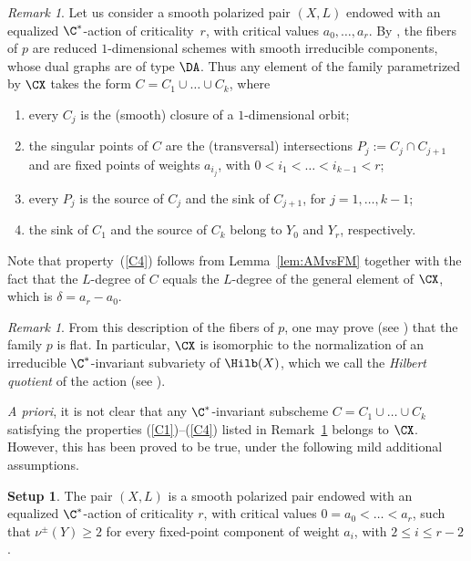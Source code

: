 \documentclass[11pt]{amsart}
\numberwithin{equation}{section}
\theoremstyle{definition}
\newtheorem{setup}[theorem]{Setup}
\theoremstyle{remark}
\newtheorem{remark}[theorem]{Remark}
\begin{document}
\begin{remark}\label{rem:chains} 
Let us consider a smooth polarized pair $(X,L)$ endowed with an equalized $\C^*$-action of criticality~$r$, with critical values $a_0,\dots,a_r$. By \cite[Lemma~4.3]{WORS6}, the fibers of $p$ are reduced $1$-dimensional schemes with smooth irreducible components, whose dual graphs are of type $\DA$. Thus any element of the family parametrized by $\CX$ takes the form $C=C_1\cup\dots\cup C_k$, 
where 
\begin{enumerate}[label=(C\arabic*),ref=C\arabic*]
\item\label{C1} every $C_j$ is the (smooth) closure of a $1$-dimensional orbit; 
\item\label{C2} the singular points of $C$ are the (transversal) intersections $P_j:=C_j\cap C_{j+1}$ and are fixed points of weights $a_{i_j}$, with  $0<i_1<\dots<i_{k-1}<r$; 
\item\label{C3} every $P_j$ is the source of $C_j$ and the sink of $C_{j+1}$, for $j=1,\dots,k-1$;  
\item\label{C4} the sink of $C_1$ and the source of $C_k$ belong to $Y_0$ and $Y_r$, respectively.
\end{enumerate}
Note that property~(\ref{C4}) follows from Lemma~\ref{lem:AMvsFM} together with the fact that the $L$-degree of $C$ equals the $L$-degree of the general element of $\CX$, which is $\delta=a_r-a_0$.
\end{remark}

\begin{remark}\label{rem:Hilb} From this description of the fibers of $p$, one may prove (see \cite[Lemma~4.5]{WORS6}) that the family $p$ is flat. In particular, $\CX$ is isomorphic to the normalization of an irreducible $\C^*$-invariant subvariety of $\Hilb(X)$, which we call the {\em Hilbert quotient} of the action (see \cite[Remark~4.6]{WORS6}). 
\end{remark}

\textit{A priori}, it is not clear that any $\C^*$-invariant subscheme $C=C_1\cup\dots\cup C_k$ satisfying the properties (\ref{C1})--(\ref{C4}) listed in Remark~\ref{rem:chains} belongs to $\CX$. However, this has been proved to be true, under the following mild additional assumptions. 

\begin{setup}\label{set:WORS6}
The pair $(X,L)$ is a smooth polarized pair endowed with an equalized $\C^*$-action of criticality $r$, with critical values $0=a_0<\dots<a_r$, such that $\nu^\pm(Y) \ge 2$ for every fixed-point component of weight $a_i$, with $2 \le i \le r-2$.
\end{setup} 
\end{document}
